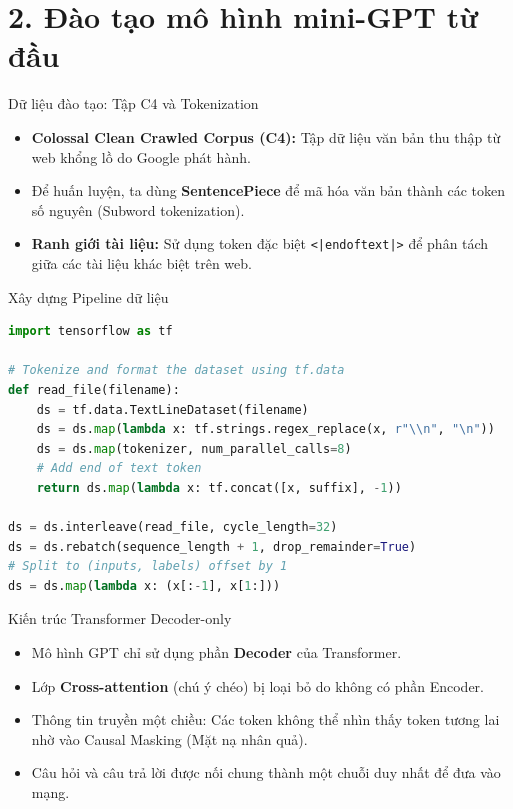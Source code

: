 \documentclass[aspectratio=169]{beamer}
\begin{document}
\section{2. Đào tạo mô hình mini-GPT từ đầu}

\begin{frame}{Dữ liệu đào tạo: Tập C4 và Tokenization}
    \begin{itemize}
        \item \textbf{Colossal Clean Crawled Corpus (C4):} Tập dữ liệu văn bản thu thập từ web khổng lồ do Google phát hành.
        \item Để huấn luyện, ta dùng \textbf{SentencePiece} để mã hóa văn bản thành các token số nguyên (Subword tokenization).
        \item \textbf{Ranh giới tài liệu:} Sử dụng token đặc biệt \texttt{<|endoftext|>} để phân tách giữa các tài liệu khác biệt trên web.
    \end{itemize}
\end{frame}

\begin{frame}[fragile]{Xây dựng Pipeline dữ liệu}
\begin{lstlisting}[language=Python]
import tensorflow as tf

# Tokenize and format the dataset using tf.data
def read_file(filename):
    ds = tf.data.TextLineDataset(filename)
    ds = ds.map(lambda x: tf.strings.regex_replace(x, r"\\n", "\n"))
    ds = ds.map(tokenizer, num_parallel_calls=8)
    # Add end of text token
    return ds.map(lambda x: tf.concat([x, suffix], -1))

ds = ds.interleave(read_file, cycle_length=32)
ds = ds.rebatch(sequence_length + 1, drop_remainder=True)
# Split to (inputs, labels) offset by 1
ds = ds.map(lambda x: (x[:-1], x[1:])) 
\end{lstlisting}
\end{frame}

\begin{frame}{Kiến trúc Transformer Decoder-only}
    \begin{itemize}
        \item Mô hình GPT chỉ sử dụng phần \textbf{Decoder} của Transformer.
        \item Lớp \textbf{Cross-attention} (chú ý chéo) bị loại bỏ do không có phần Encoder.
        \item Thông tin truyền một chiều: Các token không thể nhìn thấy token tương lai nhờ vào Causal Masking (Mặt nạ nhân quả).
        \item Câu hỏi và câu trả lời được nối chung thành một chuỗi duy nhất để đưa vào mạng.
    \end{itemize}
\end{frame}
\end{document}

